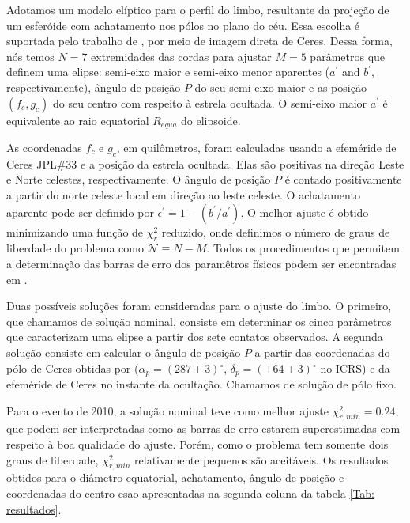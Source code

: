 \documentclass[12pt,a4paper]{monografia}
\newcommand{\degr}{\ensuremath{^{\circ}}}%
\begin{document}
Adotamos um modelo elíptico para o perfil do limbo, resultante da projeção de um esferóide com achatamento nos pólos no plano do céu. Essa escolha é suportada pelo trabalho de \cite{Drummond2014}, por meio de imagem direta de Ceres. Dessa forma, nós temos $N=7$ extremidades das cordas para ajustar $M=5$ parâmetros que definem uma elipse: semi-eixo maior e semi-eixo menor aparentes ($a^\prime$ and $b^\prime$, respectivamente), ângulo de posição $P$ do seu semi-eixo maior e as posição $(f_c,g_c)$ do seu centro com respeito à estrela ocultada. O semi-eixo maior {$a^\prime$} é equivalente ao raio equatorial $R_{equa}$ do elipsoide.

As coordenadas $f_{c}$ e $g_{c}$, em quilômetros, foram calculadas usando a efeméride de Ceres JPL\#33 \citep{Giorgini1996} e a posição da estrela ocultada. Elas são positivas na direção Leste e Norte celestes, respectivamente. O ângulo de posição $P$ é contado positivamente a partir do norte celeste local em direção ao leste celeste. O achatamento aparente pode ser definido por $\epsilon^\prime = 1 - (b^\prime/a^\prime)$. O melhor ajuste é obtido minimizando uma função de $\chi^{2}_{r}$ reduzido, onde definimos o número de graus de liberdade do problema como $\mathcal{N} \equiv N - M$. Todos os procedimentos que permitem a determinação das barras de erro dos paramêtros físicos podem ser encontradas em \cite{Braga-Ribas2013}.

Duas possíveis soluções foram consideradas para o ajuste do limbo. O primeiro, que chamamos de solução nominal, consiste em determinar os cinco parâmetros que caracterizam uma elipse a partir dos sete contatos observados. A segunda solução consiste em calcular o ângulo de posição $P$ a partir das coordenadas do pólo de Ceres obtidas por \cite{Drummond2014} ($\alpha_{p} = (287 \pm 3) \degr$, $\delta_{p} = (+64 \pm 3) \degr$ no ICRS) e da efeméride de Ceres no instante da ocultação. Chamamos de solução de pólo fixo.

Para o evento de 2010, a solução nominal teve como melhor ajuste $\chi^2_{r,min} = 0.24$, que podem ser interpretadas como as barras de erro estarem superestimadas com respeito à boa qualidade do ajuste. Porém, como o problema tem somente dois graus de liberdade, $\chi^2_{r,min}$ relativamente pequenos são aceitáveis. Os resultados obtidos para o diâmetro equatorial, achatamento, ângulo de posição e coordenadas do centro esao apresentadas na segunda coluna da tabela \ref{Tab: resultados}.
\end{document}
